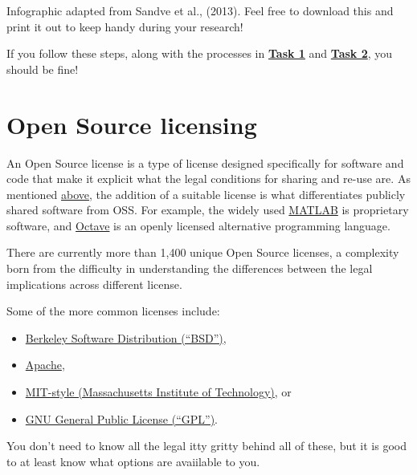 \documentclass[]{book}
\providecommand{\tightlist}{%
  \setlength{\itemsep}{0pt}\setlength{\parskip}{0pt}}
\begin{document}
Infographic adapted from Sandve et al., (2013). Feel free to download this and print it out to keep handy during your research!

If you follow these steps, along with the processes in \href{https://github.com/OpenScienceMOOC/Module-5-Open-Research-Software-and-Open-Source/blob/master/content_development/Task_1.md}{\textbf{Task 1}} and \href{https://github.com/OpenScienceMOOC/Module-5-Open-Research-Software-and-Open-Source/blob/master/content_development/Task_2.md}{\textbf{Task 2}}, you should be fine!

\hypertarget{open-source-licensing}{%
\section{Open Source licensing }\label{open-source-licensing}}

An Open Source license is a type of license designed specifically for software and code that make it explicit what the legal conditions for sharing and re-use are. As mentioned \protect\hyperlink{What_OSS}{above}, the addition of a suitable license is what differentiates publicly shared software from OSS. For example, the widely used \href{https://www.mathworks.com/products/matlab.html}{MATLAB} is proprietary software, and \href{https://www.gnu.org/software/octave/}{Octave} is an openly licensed alternative programming language.

There are currently more than 1,400 unique Open Source licenses, a complexity born from the difficulty in understanding the differences between the legal implications across different license.

Some of the more common licenses include:

\begin{itemize}
\tightlist
\item
  \href{https://en.wikipedia.org/wiki/BSD_licenses}{Berkeley Software Distribution (``BSD'')},
\item
  \href{https://www.apache.org/licenses/LICENSE-2.0}{Apache},
\item
  \href{https://opensource.org/licenses/MIT}{MIT-style (Massachusetts Institute of Technology)}, or
\item
  \href{https://www.gnu.org/licenses/gpl-3.0.en.html}{GNU General Public License (``GPL'')}.
\end{itemize}

You don't need to know all the legal itty gritty behind all of these, but it is good to at least know what options are avaiilable to you.
\end{document}
